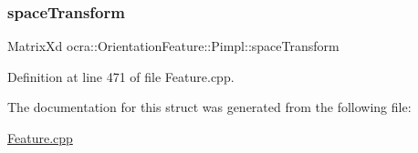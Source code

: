 \hypertarget{structocra_1_1OrientationFeature_1_1Pimpl_aabbe93797831b01bda2453053e2a1224}{}\label{structocra_1_1OrientationFeature_1_1Pimpl_aabbe93797831b01bda2453053e2a1224} 
\subsubsection{\texorpdfstring{space\+Transform}{spaceTransform}}
{\footnotesize\ttfamily Matrix\+Xd ocra\+::\+Orientation\+Feature\+::\+Pimpl\+::space\+Transform}



Definition at line 471 of file Feature.\+cpp.



The documentation for this struct was generated from the following file\+:\begin{DoxyCompactItemize}
\item 
\hyperlink{Feature_8cpp}{Feature.\+cpp}\end{DoxyCompactItemize}
